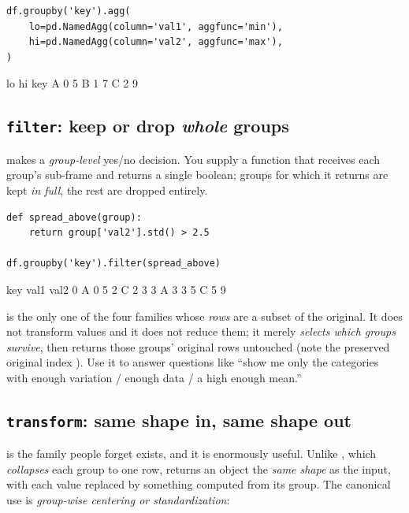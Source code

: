 \documentclass[11pt]{article}
\begin{document}
\begin{lstlisting}
df.groupby('key').agg(
    lo=pd.NamedAgg(column='val1', aggfunc='min'),
    hi=pd.NamedAgg(column='val2', aggfunc='max'),
)
\end{lstlisting}

\begin{outblock}
     lo  hi
key
A     0   5
B     1   7
C     2   9
\end{outblock}

\subsection{\texttt{filter}: keep or drop \emph{whole} groups}

 makes a \emph{group-level} yes/no decision. You supply a function that receives each group's sub-frame and returns a single boolean; groups for which it returns  are kept \emph{in full}, the rest are dropped entirely.

\begin{lstlisting}
def spread_above(group):
    return group['val2'].std() > 2.5

df.groupby('key').filter(spread_above)
\end{lstlisting}

\begin{outblock}
  key  val1  val2
0   A     0     5
2   C     2     3
3   A     3     3
5   C     5     9
\end{outblock}

\begin{intuition}
 is the only one of the four families whose \emph{rows} are a subset of the original. It does not transform values and it does not reduce them; it merely \emph{selects which groups survive}, then returns those groups' original rows untouched (note the preserved original index ). Use it to answer questions like ``show me only the categories with enough variation / enough data / a high enough mean.''
\end{intuition}

\subsection{\texttt{transform}: same shape in, same shape out}

 is the family people forget exists, and it is enormously useful. Unlike , which \emph{collapses} each group to one row,  returns an object the \emph{same shape} as the input, with each value replaced by something computed from its group. The canonical use is \emph{group-wise centering or standardization}:
\end{document}
